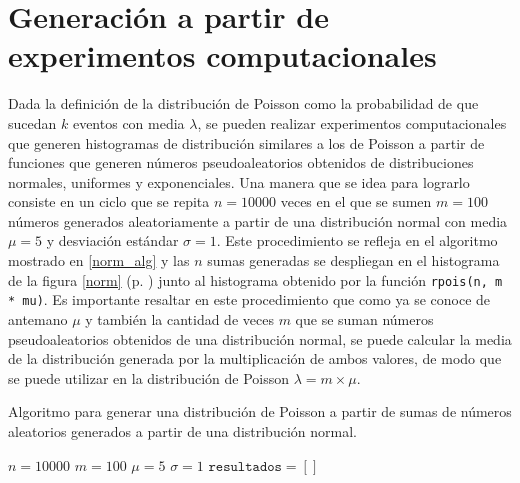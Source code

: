 \documentclass[paper=leter, fontsize=11pt]{scrartcl}
\numberwithin{equation}{section}		%
\numberwithin{figure}{section}			%
\numberwithin{table}{section}				%
\begin{document}
\section{Generación a partir de experimentos computacionales}

Dada la definición de la distribución de Poisson como la probabilidad de que sucedan $k$ eventos con media $\lambda$, se pueden realizar experimentos computacionales que generen histogramas de distribución similares a los de Poisson a partir de funciones que generen números pseudoaleatorios obtenidos de distribuciones normales, uniformes y exponenciales. Una manera que se idea para lograrlo consiste en un ciclo que se repita $n = 10000$ veces en el que se sumen $m = 100$ números generados aleatoriamente a partir de una distribución normal con media $\mu = 5$ y desviación estándar $\sigma = 1$. Este procedimiento se refleja en el algoritmo mostrado en \ref{norm_alg} y las $n$ sumas generadas se despliegan en el histograma de la figura \ref{norm} (p. \pageref{norm}) junto al histograma obtenido por la función \texttt{rpois(n, m * mu)}. Es importante resaltar en este procedimiento que como ya se conoce de antemano $\mu$ y también la cantidad de veces $m$ que se suman números pseudoaleatorios obtenidos de una distribución normal, se puede calcular la media de la distribución generada por la multiplicación de ambos valores, de modo que se puede utilizar en la distribución de Poisson $\lambda = m \times \mu$.

\begin{algorithm}
	\caption{Algoritmo para generar una distribución de Poisson a partir de sumas de números aleatorios generados a partir de una distribución normal.}
	\label{norm_alg}
	\SetAlgoLined

    \(n = 10000\)\;
    \(m = 100\)\;
    \(\mu = 5\)\;
    \(\sigma = 1\)\;
    \(\texttt{resultados} = [] \)\;
\end{algorithm}
\end{document}
